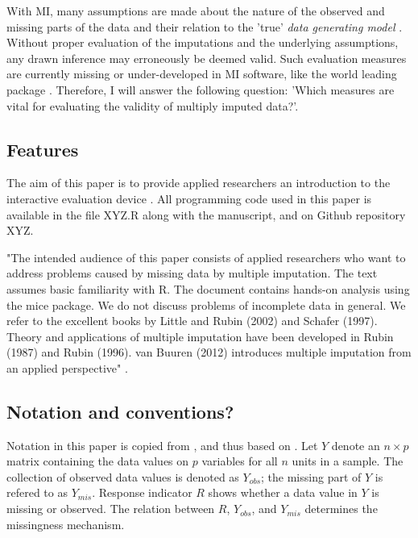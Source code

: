 \documentclass[article]{jss}
\begin{document}
With MI, many assumptions are made about the nature of the observed and missing parts of the data and their relation to the 'true' \emph{data generating model} \citep{buur18}. Without proper evaluation of the imputations and the underlying assumptions, any drawn inference may erroneously be deemed valid. Such evaluation measures are currently missing or under-developed in MI software, like the world leading  package  \citep{mice11}. Therefore, I will answer the following question: 'Which measures are vital for evaluating the validity of multiply imputed data?'.

\subsection{Features} \label{sec:features}

The aim of this paper is to provide applied researchers an introduction to the interactive evaluation device . All programming code used in this paper is available in the file XYZ.R along with the manuscript, and on Github repository XYZ. 

"The intended audience of this paper consists of applied researchers who want to address problems caused by missing data by multiple imputation. The text assumes basic familiarity with R. The document contains hands-on analysis using the mice package. We do not discuss problems of incomplete data in general. We refer to the excellent books by Little and Rubin (2002) and Schafer (1997). Theory and applications of multiple imputation have been developed in Rubin (1987) and Rubin (1996). van Buuren (2012) introduces multiple imputation from an applied perspective" \cite[p.~4]{mice}.


\subsection{Notation and conventions?} \label{sec:notation}

Notation in this paper is copied from \cite{buur18}, and thus based on \cite{rubin87}. Let $Y$ denote an $n \times p$ matrix containing the data values on $p$ variables for all $n$ units in a sample. The collection of observed data values is denoted as $Y_{obs}$; the missing part of $Y$ is refered to as $Y_{mis}$. Response indicator $R$ shows whether a data value in $Y$ is missing or observed. The relation between $R$, $Y_{obs}$, and $Y_{mis}$ determines the missingness mechanism.     
\end{document}
